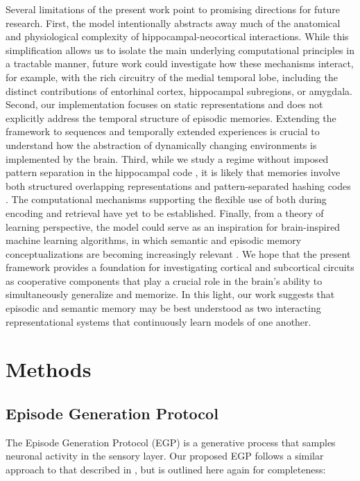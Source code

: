 \documentclass{article}
\begin{document}
Several limitations of the present work point to promising directions for future research. First, the model intentionally abstracts away much of the anatomical and physiological complexity of hippocampal-neocortical interactions. While this simplification allows us to isolate the main underlying computational principles in a tractable manner, future work could investigate how these mechanisms interact, for example, with the rich circuitry of the medial temporal lobe, including the distinct contributions of entorhinal cortex, hippocampal subregions, or amygdala. Second, our implementation focuses on static representations and does not explicitly address the temporal structure of episodic memories. Extending the framework to sequences and temporally extended experiences is crucial to understand how the abstraction of dynamically changing environments is implemented by the brain. Third, while we study a regime without imposed pattern separation in the hippocampal code , it is likely that memories involve both structured overlapping representations and pattern-separated hashing codes . The computational mechanisms supporting the flexible use of both during encoding and retrieval have yet to be established. Finally, from a theory of learning perspective, the model could serve as an inspiration for brain-inspired machine learning algorithms, in which semantic and episodic memory conceptualizations are becoming increasingly relevant .  
\newline\newline
We hope that the present framework provides a foundation for investigating cortical and subcortical circuits as cooperative components that play a crucial role in the brain's ability to simultaneously generalize and memorize. In this light, our work suggests that episodic and semantic memory may be best understood as two interacting representational systems that continuously learn models of one another.
\newpage
\section*{Methods}\label{methods}
\subsection*{Episode Generation Protocol}
The Episode Generation Protocol (EGP) is a generative process that samples neuronal activity in the sensory layer. Our proposed EGP follows a similar approach to that described in , but is outlined here again for completeness:
\end{document}
